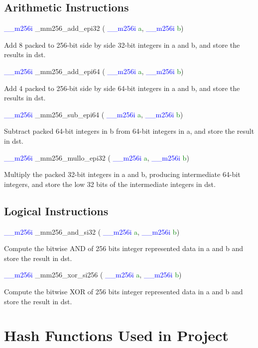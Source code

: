 \documentclass[11pt,oneside,a4paper]{article}
\begin{document}
\begin{appendices}
\subsection{Arithmetic Instructions}
\textcolor{blue}{ \_\_m256i} \_mm256\_add\_epi32 ( \textcolor{blue}{ \_\_m256i} \textcolor{green}{a}, \textcolor{blue}{ \_\_m256i} \textcolor{green}{b})
\par Add 8 packed to 256-bit side by side 32-bit integers in a and b, and store the results in dst.
\par
\textcolor{blue}{ \_\_m256i} \_mm256\_add\_epi64 ( \textcolor{blue}{ \_\_m256i} \textcolor{green}{a}, \textcolor{blue}{ \_\_m256i} \textcolor{green}{b})
\par Add 4 packed to 256-bit side by side 64-bit integers in a and b, and store the results in dst.
\par
\textcolor{blue}{ \_\_m256i} \_mm256\_sub\_epi64 ( \textcolor{blue}{ \_\_m256i} \textcolor{green}{a}, \textcolor{blue}{ \_\_m256i} \textcolor{green}{b})
\par Subtract packed 64-bit integers in b from 64-bit integers in a, and store the result in dst.
\par
\textcolor{blue}{ \_\_m256i} \_mm256\_mullo\_epi32 ( \textcolor{blue}{ \_\_m256i} \textcolor{green}{a}, \textcolor{blue}{ \_\_m256i} \textcolor{green}{b})
\par Multiply the packed 32-bit integers in a and b, producing intermediate 64-bit integers, and store the low 32 bits of the intermediate integers in dst.
\par
\subsection{Logical Instructions}
\textcolor{blue}{ \_\_m256i} \_mm256\_and\_si32 ( \textcolor{blue}{ \_\_m256i} \textcolor{green}{a}, \textcolor{blue}{ \_\_m256i} \textcolor{green}{b})
\par Compute the bitwise AND of 256 bits integer represented data in a and b and store the result in dst.
\par
\textcolor{blue}{ \_\_m256i} \_mm256\_xor\_si256 ( \textcolor{blue}{ \_\_m256i} \textcolor{green}{a}, \textcolor{blue}{ \_\_m256i} \textcolor{green}{b})
\par Compute the bitwise XOR of 256 bits integer represented data in a and b and store the result in dst.
\par


\section{Hash Functions Used in Project}

\end{appendices}
\end{document}
